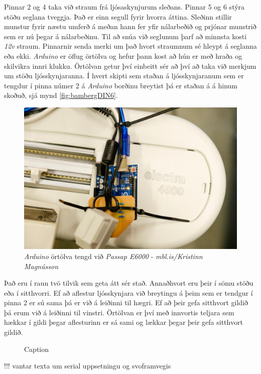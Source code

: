Pinnar 2 og 4 taka við straum frá ljósaskynjurum sleðans. Pinnar 5 og 6 stýra stöðu seglana tveggja. 
Það er einn segull fyrir hvorra áttina. Sleðinn stillir munstur fyrir næstu umferð á meðan hann fer yfir nálarbeðið og prjónar  munstrið sem er nú þegar á nálarbeðinu. Til að snúa við seglunum þarf að minnsta kosti \textit{12v} straum. Pinnarnir senda merki um það hvort straumnum sé hleypt á seglanna eða ekki. \textit{Arduino} er öflug örtölva og hefur þann kost að hún er með hraða og skilvikra innri klukku. Örtölvan getur því einbeitt sér að því að taka við merkjum um stöðu ljósskynjaranna. 
Í hvert skipti sem staðan á ljósskynjaranum sem er tengdur í pinna númer 2 á \textit{Arduino} borðinu breytist þá er staðan á á hinum skoðuð, sjá mynd \ref{fig:bambergDIN6}.

\begin{figure}
    \centering
    \includegraphics[width=0.5\linewidth]{myndir/elli/electra4600.jpg}
    \caption{\textit{Arduino} örtölva tengd við \textit{Passap E6000} - \textit{mbl.is/Kristinn Magnússon}}
    \label{fig:arduino}
\end{figure}
Það eru í raun tvö tilvik sem geta átt sér stað. Annaðhvort eru þeir í sömu stöðu eða í sitthvorri. Ef að aflestur ljósskynjara við breytingu á þeim sem er tendgur í pinna 2 er sú sama þá er við á leiðinni til hægri. Ef að þeir gefa sitthvort gildið þá erum við á leiðinni til vinstri. Örtölvan er því með innvortis teljara sem hækkar í gildi þegar aflesturinn er sá sami og lækkar þegar þeir gefa sitthvort gildið.
\begin{figure}[H]
    \centering
    \caption{Caption}
    \label{fig:enter-label}
\end{figure}
!!! vantar texta um serial uppsetningu og svoframvegis\\

